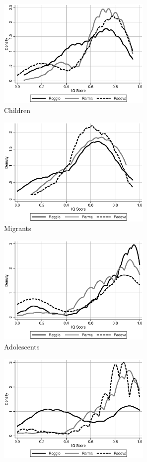 \begin{figure}[H]
	\begin{center}
	\caption{Densities of IQ Scores}\label{fig:iq-hist}
	\begin{subfigure}{.5\textwidth}
		\centering
		\includegraphics[width=20em]{../../../../Output/IQ_hist_1}
		\caption{Children}
	\end{subfigure}%
	\begin{subfigure}{.5\textwidth}
		\centering
		\includegraphics[width=20em]{../../../../Output/IQ_hist_2}
		\caption{Migrants}
	\end{subfigure}
	\begin{subfigure}{.5\textwidth}
		\centering
		\includegraphics[width=20em]{../../../../Output/IQ_hist_3}
		\caption{Adolescents}
	\end{subfigure}%
	\begin{subfigure}{.5\textwidth}
		\centering
		\includegraphics[width=20em]{../../../../Output/IQ_hist_4}

\end{subfigure}
\end{center}
\end{figure}
